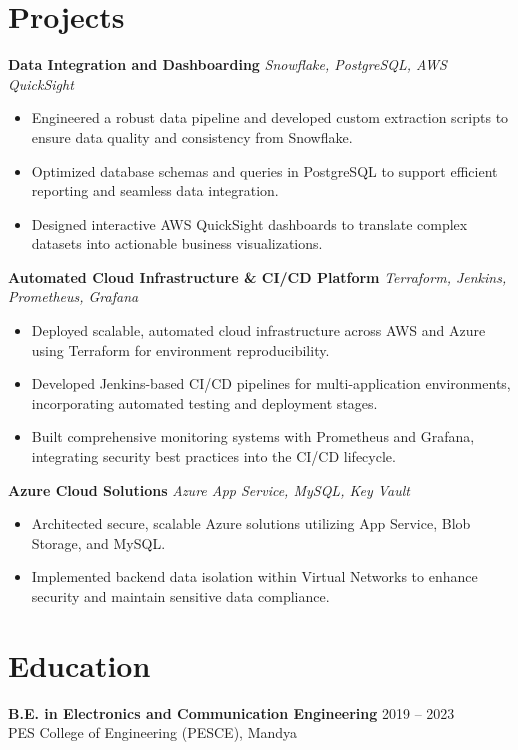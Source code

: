 \documentclass[a4paper,11pt]{article}
\begin{document}
\section*{Projects}

\textbf{Data Integration and Dashboarding} \hfill \textit{Snowflake, PostgreSQL, AWS QuickSight}
\begin{itemize}[nosep, leftmargin=0.2in]
    \item Engineered a robust data pipeline and developed custom extraction scripts to ensure data quality and consistency from Snowflake.
    \item Optimized database schemas and queries in PostgreSQL to support efficient reporting and seamless data integration.
    \item Designed interactive AWS QuickSight dashboards to translate complex datasets into actionable business visualizations.
\end{itemize}

\vspace{5pt}

\textbf{Automated Cloud Infrastructure \& CI/CD Platform} \hfill \textit{Terraform, Jenkins, Prometheus, Grafana}
\begin{itemize}[nosep, leftmargin=0.2in]
    \item Deployed scalable, automated cloud infrastructure across AWS and Azure using Terraform for environment reproducibility.
    \item Developed Jenkins-based CI/CD pipelines for multi-application environments, incorporating automated testing and deployment stages.
    \item Built comprehensive monitoring systems with Prometheus and Grafana, integrating security best practices into the CI/CD lifecycle.
\end{itemize}

\vspace{5pt}

\textbf{Azure Cloud Solutions} \hfill \textit{Azure App Service, MySQL, Key Vault}
\begin{itemize}[nosep, leftmargin=0.2in]
    \item Architected secure, scalable Azure solutions utilizing App Service, Blob Storage, and MySQL.
    \item Implemented backend data isolation within Virtual Networks to enhance security and maintain sensitive data compliance.
\end{itemize}

\section*{Education}
\textbf{B.E. in Electronics and Communication Engineering} \hfill 2019 – 2023 \\
PES College of Engineering (PESCE), Mandya
\end{document}
